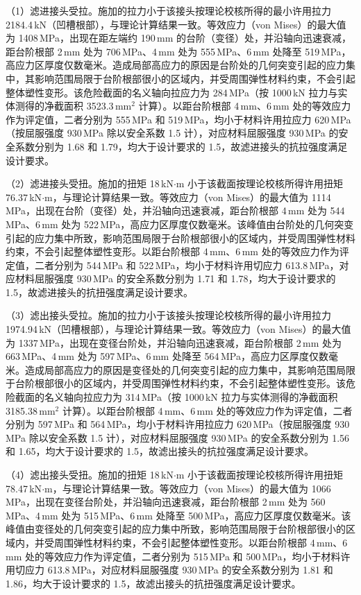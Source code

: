 （1）滤进接头受拉。施加的拉力小于该接头按理论校核所得的最小许用拉力 2184.4\,kN（凹槽根部），与理论计算结果一致。等效应力（von Mises）的最大值为 1408\,MPa，出现在距左端约 190\,mm 的台阶（变径）处，并沿轴向迅速衰减，距台阶根部 2\,mm 处为 706\,MPa、4\,mm 处为 555\,MPa、6\,mm 处降至 519\,MPa，高应力区厚度仅数毫米。造成局部高应力的原因是台阶处的几何突变引起的应力集中，其影响范围局限于台阶根部很小的区域内，并受周围弹性材料约束，不会引起整体塑性变形。该危险截面的名义轴向拉应力为 284\,MPa（按 1000\,kN 拉力与实体测得的净截面积 3523.3\,mm$^{2}$ 计算）。以距台阶根部 4\,mm、6\,mm 处的等效应力作为评定值，二者分别为 555\,MPa 和 519\,MPa，均小于材料许用拉应力 620\,MPa（按屈服强度 930\,MPa 除以安全系数 1.5 计），对应材料屈服强度 930\,MPa 的安全系数分别为 1.68 和 1.79，均大于设计要求的 1.5，故滤进接头的抗拉强度满足设计要求。

（2）滤进接头受扭。施加的扭矩 18\,kN$\cdot$m 小于该截面按理论校核所得许用扭矩 76.37\,kN$\cdot$m，与理论计算结果一致。等效应力（von Mises）的最大值为 1114\,MPa，出现在台阶（变径）处，并沿轴向迅速衰减，距台阶根部 4\,mm 处为 544\,MPa、6\,mm 处为 522\,MPa，高应力区厚度仅数毫米。该峰值由台阶处的几何突变引起的应力集中所致，影响范围局限于台阶根部很小的区域内，并受周围弹性材料约束，不会引起整体塑性变形。以距台阶根部 4\,mm、6\,mm 处的等效应力作为评定值，二者分别为 544\,MPa 和 522\,MPa，均小于材料许用切应力 613.8\,MPa，对应材料屈服强度 930\,MPa 的安全系数分别为 1.71 和 1.78，均大于设计要求的 1.5，故滤进接头的抗扭强度满足设计要求。

（3）滤出接头受拉。施加的拉力小于该接头按理论校核所得的最小许用拉力 1974.94\,kN（凹槽根部），与理论计算结果一致。等效应力（von Mises）的最大值为 1337\,MPa，出现在变径台阶处，并沿轴向迅速衰减，距台阶根部 2\,mm 处为 663\,MPa、4\,mm 处为 597\,MPa、6\,mm 处降至 564\,MPa，高应力区厚度仅数毫米。造成局部高应力的原因是变径处的几何突变引起的应力集中，其影响范围局限于台阶根部很小的区域内，并受周围弹性材料约束，不会引起整体塑性变形。该危险截面的名义轴向拉应力为 314\,MPa（按 1000\,kN 拉力与实体测得的净截面积 3185.38\,mm$^{2}$ 计算）。以距台阶根部 4\,mm、6\,mm 处的等效应力作为评定值，二者分别为 597\,MPa 和 564\,MPa，均小于材料许用拉应力 620\,MPa（按屈服强度 930\,MPa 除以安全系数 1.5 计），对应材料屈服强度 930\,MPa 的安全系数分别为 1.56 和 1.65，均大于设计要求的 1.5，故滤出接头的抗拉强度满足设计要求。

（4）滤出接头受扭。施加的扭矩 18\,kN$\cdot$m 小于该截面按理论校核所得许用扭矩 78.47\,kN$\cdot$m，与理论计算结果一致。等效应力（von Mises）的最大值为 1066\,MPa，出现在变径台阶处，并沿轴向迅速衰减，距台阶根部 2\,mm 处为 560\,MPa、4\,mm 处为 515\,MPa、6\,mm 处降至 500\,MPa，高应力区厚度仅数毫米。该峰值由变径处的几何突变引起的应力集中所致，影响范围局限于台阶根部很小的区域内，并受周围弹性材料约束，不会引起整体塑性变形。以距台阶根部 4\,mm、6\,mm 处的等效应力作为评定值，二者分别为 515\,MPa 和 500\,MPa，均小于材料许用切应力 613.8\,MPa，对应材料屈服强度 930\,MPa 的安全系数分别为 1.81 和 1.86，均大于设计要求的 1.5，故滤出接头的抗扭强度满足设计要求。

